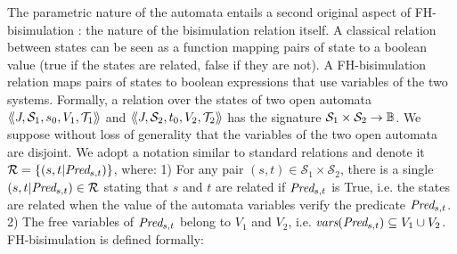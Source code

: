 \documentclass{lmcs}
\begin{document}
The parametric nature of the automata entails a second original aspect of FH-bisimulation : the nature of the bisimulation relation itself.
 A classical relation between states can be seen as a function mapping pairs of state to a boolean value (true if the states are related, false if they are not). A FH-bisimulation relation maps pairs of states to boolean expressions that use variables of the two systems.  %
Formally, a relation over the states of two open automata  $\langle\hspace{-0.45ex}\langle J,\mathcal{S}_1, s_0,V_1,
   \mathcal{T}_1 \rangle\hspace{-0.45ex}\rangle$ and $\langle\hspace{-0.45ex}\langle J,\mathcal{S}_2,t_0,V_2, \mathcal{T}_2 \rangle\hspace{-0.45ex}\rangle$ has the signature $\mathcal{S}_1\times\mathcal{S}_2\to\mathbb{B}$. 
We suppose without loss of generality that the variables of the two open automata are disjoint.
We adopt a notation similar to standard relations and denote it
 $\mathcal{R}=\{(s,t|\Pred_{s,t})\}$, where: 1) For any pair $(s,t)\in \mathcal{S}_1\times \mathcal{S}_2$, there is a 
   single
      $(s,t|\Pred_{s,t})\in\mathcal{R}$  stating that $s$ and $t$ are related 
      if $\Pred_{s,t}$       is 
      True, i.e. the states are related when the value of the automata variables%
  verify the predicate $\Pred_{s,t}$. 2) The free variables of  $\Pred_{s,t}$ belong to $V_1$ and $V_2$, i.e. $\vars(\Pred_{s,t})\subseteq V_1\cup V_2$.
 FH-bisimulation is defined formally: 
\end{document}
